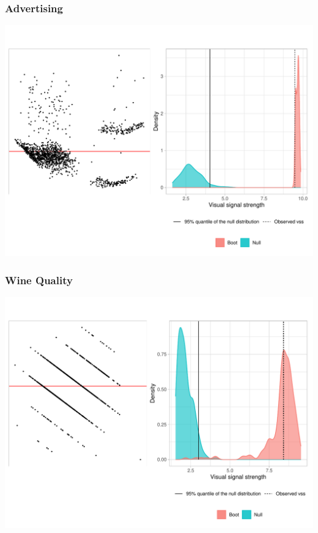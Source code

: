 \documentclass[]{interact}
\theoremstyle{plain}%
\theoremstyle{definition}
\theoremstyle{remark}
\begin{document}
\hypertarget{advertising}{%
\subsubsection{Advertising}\label{advertising}}

\begin{center}\includegraphics[width=1\linewidth]{paper_files/figure-latex/unnamed-chunk-12-1} \end{center}

\hypertarget{wine-quality}{%
\subsubsection{Wine Quality}\label{wine-quality}}

\begin{center}\includegraphics[width=1\linewidth]{paper_files/figure-latex/unnamed-chunk-16-1} \end{center}
\end{document}
